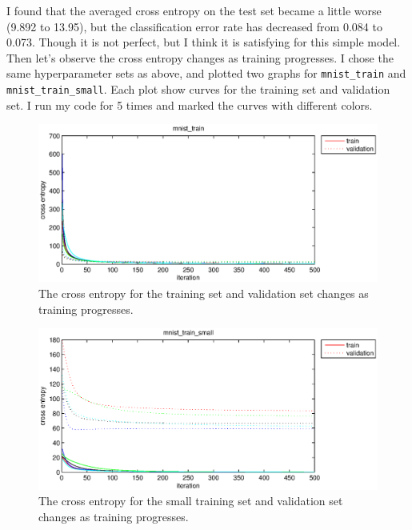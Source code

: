 \documentclass{article}
\begin{document}
I found that the averaged cross entropy on the test set became a little worse (9.892 to 13.95), but the classification error rate has decreased from 0.084 to 0.073. Though it is not perfect, but I think it is satisfying for this simple model.\\

Then let's observe the cross entropy changes as training progresses. I chose the same hyperparameter sets as above, and plotted two graphs for \texttt{mnist\_train} and \texttt{mnist\_train\_small}. Each plot show curves for the training set and validation set. I run my code for 5 times and marked the curves with different colors.\\

\begin{figure}[htb]
\centering
\includegraphics[width=\textwidth]{ce-train.eps}
\caption{The cross entropy for the training set and validation set changes as training progresses.
\label{fig:ce-train}}
\end{figure}

\begin{figure}[htb]
\centering
\includegraphics[width=\textwidth]{ce-train-s.eps}
\caption{The cross entropy for the small training set and validation set changes as training progresses.
\label{fig:ce-train-s}}
\end{figure}
\end{document}
